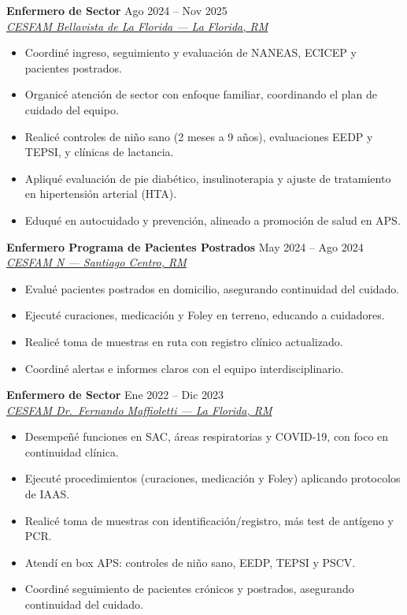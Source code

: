 \documentclass[11pt,a4paper]{article}
\newcommand{\cventry}[3]{%
  \textbf{#1} \hfill #2\\
  \textit{#3}\\[2pt]
}
\newcommand{\maps}[2]{%
  \href{https://www.google.com/maps/search/?api=1\&query=#1}{#2}%
}
\begin{document}
\cventry{Enfermero de Sector}
{Ago 2024 -- Nov 2025}
{\maps{CESFAM+Bellavista+Pudeto+7100,+La+Florida,+Santiago}{CESFAM Bellavista de La Florida — La Florida, RM}}
\begin{itemize}
  \item Coordiné ingreso, seguimiento y evaluación de NANEAS, ECICEP y pacientes postrados.
  \item Organicé atención de sector con enfoque familiar, coordinando el plan de cuidado del equipo.
  \item Realicé controles de niño sano (2 meses a 9 años), evaluaciones EEDP y TEPSI, y clínicas de lactancia.
  \item Apliqué evaluación de pie diabético, insulinoterapia y ajuste de tratamiento en hipertensión arterial (HTA).
  \item Eduqué en autocuidado y prevención, alineado a promoción de salud en APS.
\end{itemize}
\vspace{6pt}

\cventry{Enfermero Programa de Pacientes Postrados}
{May 2024 -- Ago 2024}
{\maps{CESFAM+N5+Union+Latinoamericana+98,+Santiago+Centro}{CESFAM N\textdegree5 — Santiago Centro, RM}}
\begin{itemize}
  \item Evalué pacientes postrados en domicilio, asegurando continuidad del cuidado.
  \item Ejecuté curaciones, medicación y Foley en terreno, educando a cuidadores.
  \item Realicé toma de muestras en ruta con registro clínico actualizado.
  \item Coordiné alertas e informes claros con el equipo interdisciplinario.
\end{itemize}
\vspace{6pt}

\cventry{Enfermero de Sector}
{Ene 2022 -- Dic 2023}
{\maps{CESFAM+Dr.+Fernando+Maffioletti+Av.+Central+301,+La+Florida,+Santiago}{CESFAM Dr.\ Fernando Maffioletti — La Florida, RM}}
\begin{itemize}
  \item Desempeñé funciones en SAC, áreas respiratorias y COVID-19, con foco en continuidad clínica.
  \item Ejecuté procedimientos (curaciones, medicación y Foley) aplicando protocolos de IAAS.
  \item Realicé toma de muestras con identificación/registro, más test de antígeno y PCR.
  \item Atendí en box APS: controles de niño sano, EEDP, TEPSI y PSCV.
  \item Coordiné seguimiento de pacientes crónicos y postrados, asegurando continuidad del cuidado.
\end{itemize}
\vspace{6pt}
\end{document}

